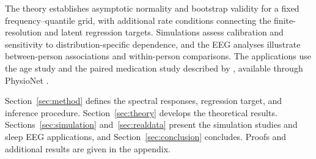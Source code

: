 \documentclass[12pt,a4paper]{article}
\begin{document}
The theory establishes asymptotic normality and bootstrap validity for a fixed frequency--quantile grid, with additional rate conditions connecting the finite-resolution and latent regression targets. Simulations assess calibration and sensitivity to distribution-specific dependence, and the EEG analyses illustrate between-person associations and within-person comparisons. The applications use the age study and the paired medication study described by \citet{Mourtazaev1995,Kemp2000}, available through PhysioNet \citep{Goldberger2000,Pollard2026}.

Section~\ref{sec:method} defines the spectral responses, regression target, and inference procedure. Section~\ref{sec:theory} develops the theoretical results. Sections~\ref{sec:simulation} and~\ref{sec:realdata} present the simulation studies and sleep EEG applications, and Section~\ref{sec:conclusion} concludes. Proofs and additional results are given in the appendix.
\end{document}
